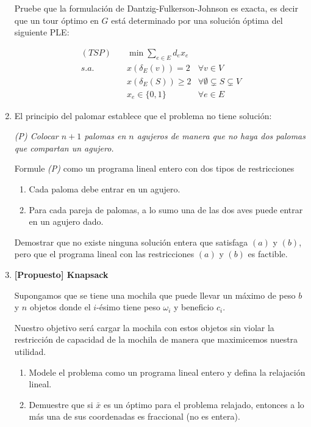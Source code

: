 \begin{enumerate}[label ={\bf P\arabic*}]
	Pruebe que la formulación de Dantzig-Fulkerson-Johnson es exacta, es decir que un tour óptimo en $G$ está determinado por una solución óptima del siguiente PLE:

	\[\begin{array}{llr}
	(TSP)\quad 	&\displaystyle\min \sum_{e \in E} d_e x_e &\\
	s.a. \quad  & x(\delta_{E}(v))=2 & \forall v \in V\\
				& x(\delta_{E}(S)) \geq 2 & \forall \emptyset \subsetneq S \subsetneq V\\
				& x_e \in \{0,1\} & \forall e \in E
	\end{array}\]

	\item El principio del palomar establece que el problema no tiene solución:

	\textit{(P) Colocar $n+1$ palomas en $n$ agujeros de manera que no haya dos palomas que compartan un agujero.}
	
	Formule \textit{(P)} como un programa lineal entero con dos tipos de restricciones
	\begin{enumerate}
		\item Cada paloma debe entrar en un agujero.
		\item Para cada pareja de palomas, a lo sumo una de las dos aves puede entrar en un agujero dado.
	\end{enumerate}
	
	Demostrar que no existe ninguna solución entera que satisfaga $(a)$ y $(b)$, pero que el programa lineal con las restricciones $(a)$ y $(b)$ es factible.

	\item \textbf{[Propuesto] Knapsack}

	Supongamos que se tiene una mochila que puede llevar un máximo de peso $b$ y $n$ objetos donde el $i$-ésimo tiene peso $\omega_i$ y beneficio $c_i$.
	
	Nuestro objetivo será cargar la mochila con estos objetos sin violar la restricción de capacidad de la mochila de manera que maximicemos nuestra utilidad.

	\begin{enumerate}
		\item Modele el problema como un programa lineal entero y defina la relajación lineal.
	
		\item Demuestre que si $\bar{x}$ es un óptimo para el problema relajado, entonces a lo más una de sus coordenadas es fraccional (no es entera).
	\end{enumerate}


\end{enumerate}
